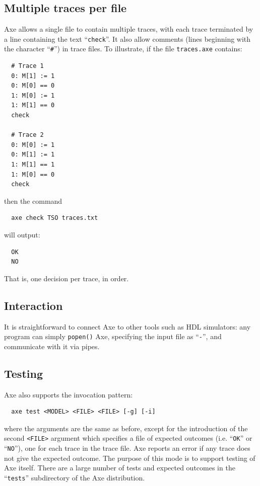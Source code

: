 \documentclass[11pt]{article}
\begin{document}
\subsection*{Multiple traces per file}

Axe allows a single file to contain multiple traces, with each trace
terminated by a line containing the text ``\verb!check!''.  It also allow
comments (lines beginning with the character ``\verb!#!'') in trace
files.
To illustrate, if the file \verb!traces.axe! contains:
\begin{verbatim}
  # Trace 1
  0: M[1] := 1
  0: M[0] == 0
  1: M[0] := 1
  1: M[1] == 0
  check

  # Trace 2
  0: M[0] := 1
  0: M[1] := 1
  1: M[1] == 1
  1: M[0] == 0
  check
\end{verbatim}
\noindent then the command
\begin{verbatim}
  axe check TSO traces.txt
\end{verbatim}
\noindent will output:
\begin{verbatim}
  OK
  NO
\end{verbatim}
\noindent That is, one decision per trace, in order.

\subsection*{Interaction}

It is straightforward to connect Axe to other tools such as HDL
simulators: any program can simply \verb!popen()! Axe, specifying the
input file as ``\verb!-!'', and communicate with it via pipes.

\subsection*{Testing}

Axe also supports the invocation pattern:
\begin{verbatim}
  axe test <MODEL> <FILE> <FILE> [-g] [-i]
\end{verbatim}
\noindent where the arguments are the same as before, except for the
introduction of the
second \verb!<FILE>! argument which specifies a file of expected
outcomes (i.e. ``\verb!OK!'' or ``\verb!NO!''), one for each trace in the trace
file.  Axe reports an error if any trace does not give
the expected outcome.  The purpose of this mode is to support testing of
Axe itself.  There are a large number of tests and expected outcomes
in the ``\verb!tests!'' subdirectory of the Axe distribution.
\end{document}
